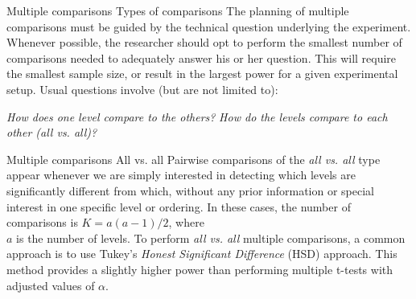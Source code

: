 \documentclass[t]{beamer}
\begin{document}

\begin{ftst}
{Multiple comparisons}
{Types of comparisons}
The planning of multiple comparisons must be guided by the technical question underlying the experiment.
\vone
Whenever possible, the researcher should opt to perform the smallest number of comparisons needed to adequately answer his or her question. This will require the smallest sample size, or result in the largest power for a given experimental setup.
\vone
Usual questions involve (but are not limited to):

\vhalf
\bitems\textit{How does one level compare to the others?}
\spitem\textit{How do the levels compare to each other (all vs. all)?}
\eitem
\end{ftst}


\begin{ftst}
{Multiple comparisons}
{All vs. all}
Pairwise comparisons of the \textit{all vs. all} type appear whenever we are simply interested in detecting which levels are significantly different from which, without any prior information or special interest in one specific level or ordering.
\vone
In these cases, the number of comparisons is $K=a(a-1)/2$, where\\$a$ is the number of levels.
\vone
To perform \textit{all vs. all} multiple comparisons, a common approach is to use Tukey's \textit{Honest Significant Difference} (HSD) approach. This method provides a slightly higher power than performing multiple t-tests with adjusted values of $\alpha$.%
\end{ftst}

\end{document}

